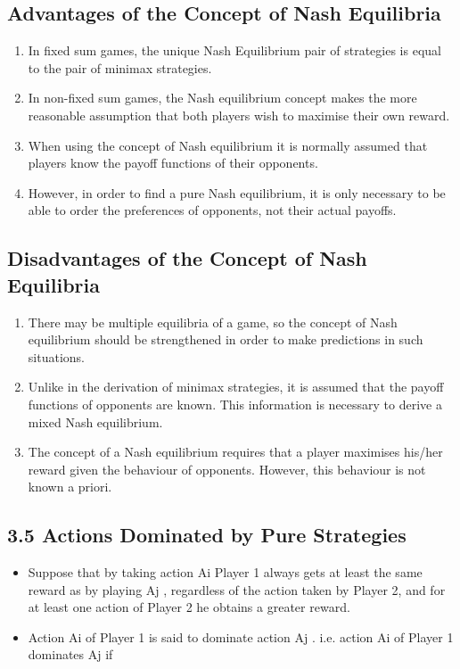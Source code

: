 \documentclass[]{article}
\begin{document}
	\subsection{Advantages of the Concept of Nash Equilibria}
	\begin{enumerate}
		\item  In fixed sum games, the unique Nash Equilibrium pair
		of strategies is equal to the pair of minimax
		strategies.
		\item  In non-fixed sum games, the Nash equilibrium
		concept makes the more reasonable assumption that
		both players wish to maximise their own reward.
		\item  When using the concept of Nash equilibrium it is
		normally assumed that players know the payoff
		functions of their opponents.
\item  However, in order to
		find a pure Nash equilibrium, it is only necessary to
		be able to order the preferences of opponents, not
		their actual payoffs.
	\end{enumerate}
	
	\subsection{Disadvantages of the Concept of Nash Equilibria}
	\begin{enumerate}
		\item There may be multiple equilibria of a game, so the
		concept of Nash equilibrium should be strengthened
		in order to make predictions in such situations.
		\item Unlike in the derivation of minimax strategies, it is
		assumed that the payoff functions of opponents are
		known. This information is necessary to derive a
		mixed Nash equilibrium.
		\item  The concept of a Nash equilibrium requires that a
		player maximises his/her reward given the behaviour
		of opponents. However, this behaviour is not known
		a priori.
	\end{enumerate}
	
	\subsection{3.5 Actions Dominated by Pure Strategies}
\begin{itemize}
	\item 	Suppose that by taking action Ai Player 1 always gets at least the
	same reward as by playing Aj , regardless of the action taken by
	Player 2, and for at least one action of Player 2 he obtains a
	greater reward. 
	\item Action Ai of Player 1 is said to dominate action Aj	.
	i.e. action Ai of Player 1 dominates Aj
	if
\end{itemize}
\end{document}
